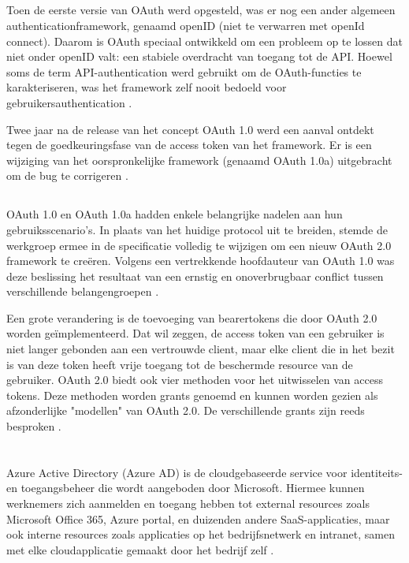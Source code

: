 \subsection{}
Toen de eerste versie van OAuth werd opgesteld, was er nog een ander algemeen authenticationframework, genaamd openID (niet te verwarren met openId connect). Daarom is OAuth speciaal ontwikkeld om een probleem op te lossen dat niet onder openID valt: een stabiele overdracht van toegang tot de API. Hoewel soms de term API-authentication werd gebruikt om de OAuth-functies te karakteriseren, was het framework zelf nooit bedoeld voor gebruikersauthentication \autocite{Chen2014}.

Twee jaar na de release van het concept OAuth 1.0 werd een aanval ontdekt tegen de goedkeuringsfase van de access token van het framework. Er is een wijziging van het oorspronkelijke framework (genaamd OAuth 1.0a) uitgebracht om de bug te corrigeren \autocite{Chen2014}.
\subsection{}
OAuth 1.0 en OAuth 1.0a hadden enkele belangrijke nadelen aan hun gebruiksscenario's. In plaats van het huidige protocol uit te breiden, stemde de werkgroep ermee in de specificatie volledig te wijzigen om een nieuw OAuth 2.0 framework te creëren. Volgens een vertrekkende hoofdauteur van OAuth 1.0 was deze beslissing het resultaat van een ernstig en onoverbrugbaar conflict tussen verschillende belangengroepen \autocite{Chen2014}.

Een grote verandering is de toevoeging van bearertokens die door OAuth 2.0 worden geïmplementeerd. Dat wil zeggen, de access token van een gebruiker is niet langer gebonden aan een vertrouwde client, maar elke client die in het bezit is van deze token heeft vrije toegang tot de beschermde resource van de gebruiker. OAuth 2.0 biedt ook vier methoden voor het uitwisselen van access tokens. Deze methoden worden grants genoemd en kunnen worden gezien als afzonderlijke "modellen" van OAuth 2.0. De verschillende grants zijn reeds besproken \autocite{Chen2014}.
\section{}
\label{sec:AzureRollingKeys}
Azure Active Directory (Azure AD) is de cloudgebaseerde service voor identiteits- en toegangsbeheer die wordt aangeboden door Microsoft. Hiermee kunnen werknemers zich aanmelden en toegang hebben tot external resources zoals Microsoft Office 365, Azure portal, en duizenden andere SaaS-applicaties, maar ook interne resources zoals applicaties op het bedrijfsnetwerk en intranet, samen met elke cloudapplicatie gemaakt door het bedrijf zelf \autocite{Boucher2019} \autocite{msaburnley2019}.
